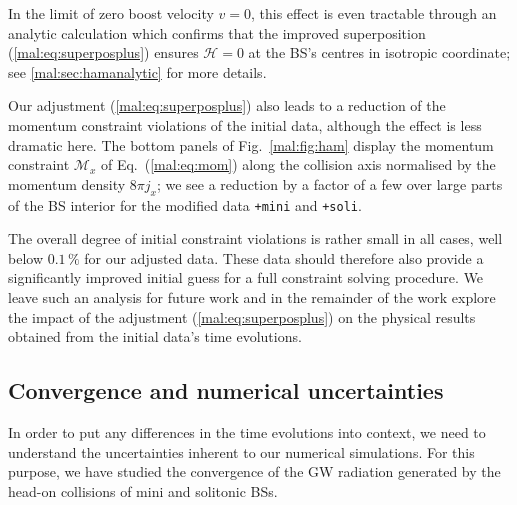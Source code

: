 In the limit of zero boost velocity $v=0$, this effect is even
tractable through an analytic calculation which confirms
that the improved superposition (\ref{mal:eq:superposplus})
ensures $\mathcal{H}=0$ at the BS's centres in isotropic
coordinate; see \ref{mal:sec:hamanalytic} for more details.

Our adjustment (\ref{mal:eq:superposplus}) also leads to
a reduction of the momentum constraint violations of the
initial data, although the effect is less dramatic here.
The bottom panels of Fig.~\ref{mal:fig:ham} display the
momentum constraint $\mathcal{M}_x$ of Eq.~(\ref{mal:eq:mom})
along the collision axis normalised by the momentum
density $8\pi j_x$; we see a reduction by a factor of a few
over large parts of the BS interior for the modified
data {\tt +mini} and {\tt +soli}.

The overall degree of initial constraint violations is
rather small in all cases, well below $0.1\,\%$ for
our adjusted data. These data should therefore also
provide a significantly improved initial guess for
a full constraint solving procedure. We leave such an
analysis for future work and in the remainder of the
work explore the impact of the adjustment
(\ref{mal:eq:superposplus}) on the physical results
obtained from the initial data's time evolutions.

\subsection{Convergence and numerical uncertainties}
%
In order to put any differences in the time evolutions
into context, we need to understand the uncertainties
inherent to our numerical simulations. For this purpose,
we have studied the convergence of the GW radiation
generated by the head-on collisions of mini and solitonic
BSs.

